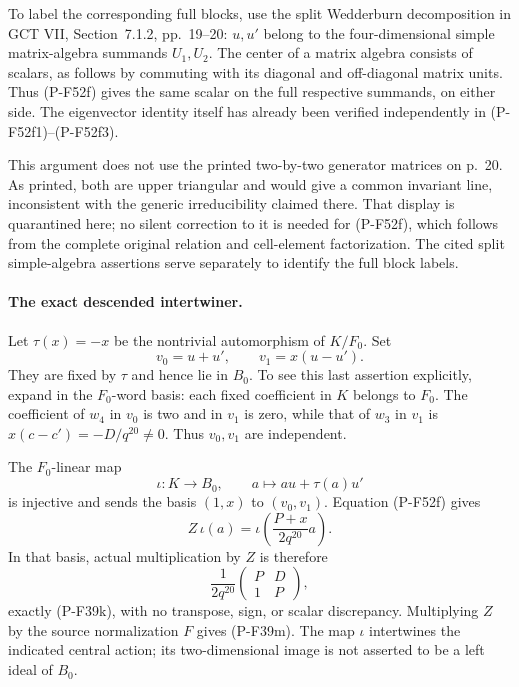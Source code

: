 To label the corresponding full blocks, use the split Wedderburn
decomposition in GCT VII, Section~7.1.2, pp.~19--20: $u,u'$
belong to the four-dimensional simple matrix-algebra summands
$U_1,U_2$. The center of a matrix algebra consists of scalars,
as follows by commuting with its diagonal and off-diagonal matrix
units. Thus (P-F52f) gives the same scalar on the full respective
summands, on either side. The eigenvector identity itself has
already been verified independently in (P-F52f1)--(P-F52f3).

This argument does not use the printed two-by-two generator
matrices on p.~20. As printed, both are upper triangular and
would give a common invariant line, inconsistent with the
generic irreducibility claimed there. That display is
quarantined here; no silent correction to it is needed for
(P-F52f), which follows from the complete original relation
and cell-element factorization. The cited split simple-algebra
assertions serve separately to identify the full block labels.

\paragraph{The exact descended intertwiner.}
Let $\tau(x)=-x$ be the nontrivial automorphism of $K/F_0$.
Set
\[
            v_0=u+u',\qquad v_1=x(u-u').                       \tag{P-F52g}
\]
They are fixed by $\tau$ and hence lie in $B_0$. To see this
last assertion explicitly, expand in the $F_0$-word basis:
each fixed coefficient in $K$ belongs to $F_0$.
The coefficient of $w_4$ in $v_0$ is two and in $v_1$ is zero,
while that of $w_3$ in $v_1$ is
$x(c-c')=-D/q^{20}\ne0$. Thus $v_0,v_1$ are independent.

The $F_0$-linear map
\[
       \iota:K\longrightarrow B_0,
           \qquad a\longmapsto au+\tau(a)u'                  \tag{P-F52h}
\]
is injective and sends the basis $(1,x)$ to $(v_0,v_1)$.
Equation (P-F52f) gives
\[
       Z\,\iota(a)=\iota\left(\frac{P+x}{2q^{20}}a\right).
                                                               \tag{P-F52i}
\]
In that basis, actual multiplication by $Z$ is therefore
\[
                 \frac1{2q^{20}}
                       \begin{pmatrix}P&D\\1&P\end{pmatrix}, \tag{P-F52j}
\]
exactly (P-F39k), with no transpose, sign, or scalar discrepancy.
Multiplying $Z$ by the source normalization $F$ gives (P-F39m).
The map $\iota$ intertwines the indicated central action; its
two-dimensional image is not asserted to be a left ideal of $B_0$.

